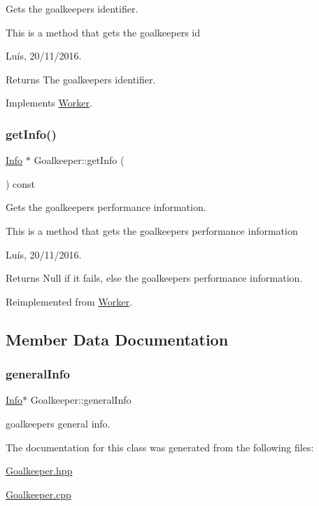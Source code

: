 Gets the goalkeeper\textquotesingle{}s identifier. 

This is a method that gets the goalkeeper\textquotesingle{}s id

Luís, 20/11/2016. 

\begin{DoxyReturn}{Returns}
The goalkeeper\textquotesingle{}s identifier. 
\end{DoxyReturn}


Implements \hyperlink{class_worker_a8b3e221c4a1ebd12ade03ee9b9c86182}{Worker}.

\hypertarget{class_goalkeeper_a8636c061d81440070cf554d5a3923acb}{}\label{class_goalkeeper_a8636c061d81440070cf554d5a3923acb} 
\subsubsection{\texorpdfstring{get\+Info()}{getInfo()}}
{\footnotesize\ttfamily \hyperlink{class_info}{Info} $\ast$ Goalkeeper\+::get\+Info (\begin{DoxyParamCaption}{ }\end{DoxyParamCaption}) const\hspace{0.3cm}{\ttfamily [virtual]}}



Gets the goalkeeper\textquotesingle{}s performance information. 

This is a method that gets the goalkeeper\textquotesingle{}s performance information

Luís, 20/11/2016. 

\begin{DoxyReturn}{Returns}
Null if it fails, else the goalkeeper\textquotesingle{}s performance information. 
\end{DoxyReturn}


Reimplemented from \hyperlink{class_worker_a95a4f7c750644937859b8e14515a480e}{Worker}.



\subsection{Member Data Documentation}
\hypertarget{class_goalkeeper_a30367439b905583e7b5562d19ab531f3}{}\label{class_goalkeeper_a30367439b905583e7b5562d19ab531f3} 
\subsubsection{\texorpdfstring{general\+Info}{generalInfo}}
{\footnotesize\ttfamily \hyperlink{class_info}{Info}$\ast$ Goalkeeper\+::general\+Info\hspace{0.3cm}{\ttfamily [private]}}



goalkeeper\textquotesingle{}s general info. 



The documentation for this class was generated from the following files\+:\begin{DoxyCompactItemize}
\item 
\hyperlink{_goalkeeper_8hpp}{Goalkeeper.\+hpp}\item 
\hyperlink{_goalkeeper_8cpp}{Goalkeeper.\+cpp}\end{DoxyCompactItemize}
